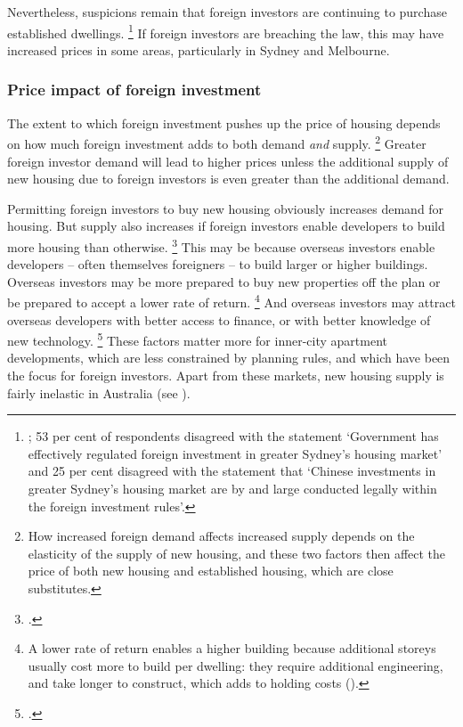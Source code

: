 Nevertheless, suspicions remain that foreign investors are continuing to purchase established dwellings.%
    \footnote{\textcite{RogersetalChineseRealEstate}; 53 per cent of respondents disagreed with the statement `Government has effectively regulated foreign investment in greater Sydney's housing market' and 25 per cent disagreed with the statement that `Chinese investments in greater Sydney's housing market are by and large conducted legally within the foreign investment rules'.}
If foreign investors are breaching the law, this may have increased prices in some areas, particularly in Sydney and Melbourne.

\subsubsection{Price impact of foreign investment}\label{subsec:foreign-investment-prices}

The extent to which foreign investment pushes up the price of housing depends on how much foreign investment adds to both demand \emph{and} supply.%
	\footnote{How increased foreign demand affects increased supply depends on the elasticity of the supply of new housing, and these two factors then affect the price of both new housing and established housing, which are close substitutes.}
Greater foreign investor demand will lead to higher prices unless the additional supply of new housing due to foreign investors is even greater than the additional demand.

Permitting foreign investors to buy new housing obviously increases demand for housing.
But supply also increases if foreign investors enable developers to build more housing than otherwise.%
  \footcite{ACIL2017Property}
This may be because overseas investors enable developers -- often themselves foreigners -- to build larger or higher buildings. Overseas investors may be more prepared to buy new properties off the plan or be prepared to accept a lower rate of return.%
    \footnote{A lower rate of return enables a higher building because additional storeys usually cost more to build per dwelling: they require additional engineering, and take longer to construct, which adds to holding costs (\textcite[][5]{ShooryRosewall2017}).}
And overseas investors may attract overseas developers with better access to finance, or with better knowledge of new technology.%
	\footcites{Kearns2017ausproperty}{GauderHoussardOrsmond}
These factors matter more for inner-city apartment developments, which are less constrained by planning rules, and which have been the focus for foreign investors.
Apart from these markets, new housing supply is fairly inelastic in Australia (see ).

